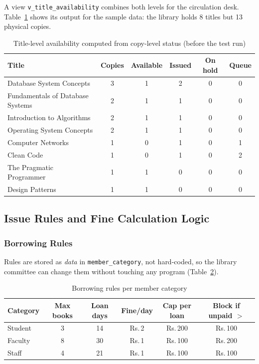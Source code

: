 \documentclass[11pt,a4paper]{report}
\begin{document}
A view \texttt{v\_title\_availability} combines both levels for the circulation desk. Table~\ref{tab:avail} shows its output for the sample data: the library holds 8 titles but 13 physical copies.

\begin{table}[H]
    \centering
    \caption{Title-level availability computed from copy-level status (before the test run)}
    \label{tab:avail}
    \footnotesize
    \begin{tabular}{|l|c|c|c|c|c|}
        \hline
        \textbf{Title} & \textbf{Copies} & \textbf{Available} & \textbf{Issued} & \textbf{On hold} & \textbf{Queue} \\ \hline
        Database System Concepts & 3 & 1 & 2 & 0 & 0 \\ \hline
        Fundamentals of Database Systems & 2 & 1 & 1 & 0 & 0 \\ \hline
        Introduction to Algorithms & 2 & 1 & 1 & 0 & 0 \\ \hline
        Operating System Concepts & 2 & 1 & 1 & 0 & 0 \\ \hline
        Computer Networks & 1 & 0 & 1 & 0 & 1 \\ \hline
        Clean Code & 1 & 0 & 1 & 0 & 2 \\ \hline
        The Pragmatic Programmer & 1 & 1 & 0 & 0 & 0 \\ \hline
        Design Patterns & 1 & 1 & 0 & 0 & 0 \\ \hline
    \end{tabular}
\end{table}

\subsection{Issue Rules and Fine Calculation Logic}
\label{sec:rules}
\subsubsection{Borrowing Rules}
Rules are stored as \emph{data} in \texttt{member\_category}, not hard-coded, so the library committee can change them without touching any program (Table~\ref{tab:rules}).

\begin{table}[H]
    \centering
    \caption{Borrowing rules per member category}
    \label{tab:rules}
    \small
    \begin{tabular}{|l|c|c|c|c|c|}
        \hline
        \textbf{Category} & \textbf{Max books} & \textbf{Loan days} & \textbf{Fine/day} & \textbf{Cap per loan} & \textbf{Block if unpaid $>$} \\ \hline
        Student & 3 & 14 & Rs.\,2 & Rs.\,200 & Rs.\,100 \\ \hline
        Faculty & 8 & 30 & Rs.\,1 & Rs.\,100 & Rs.\,200 \\ \hline
        Staff   & 4 & 21 & Rs.\,1 & Rs.\,100 & Rs.\,100 \\ \hline
    \end{tabular}
\end{table}
\end{document}
